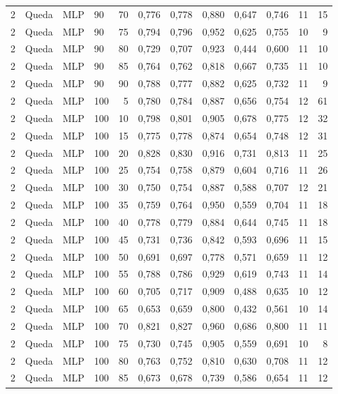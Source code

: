 \begin{longtable}{ccclrrrrrrrr}
2 & Queda & MLP & 90 & 70 & 0,776 & 0,778 & 0,880 & 0,647 & 0,746 & 11 & 15 \\
2 & Queda & MLP & 90 & 75 & 0,794 & 0,796 & 0,952 & 0,625 & 0,755 & 10 & 9 \\
2 & Queda & MLP & 90 & 80 & 0,729 & 0,707 & 0,923 & 0,444 & 0,600 & 11 & 10 \\
2 & Queda & MLP & 90 & 85 & 0,764 & 0,762 & 0,818 & 0,667 & 0,735 & 11 & 10 \\
2 & Queda & MLP & 90 & 90 & 0,788 & 0,777 & 0,882 & 0,625 & 0,732 & 11 & 9 \\
2 & Queda & MLP & 100 & 5 & 0,780 & 0,784 & 0,887 & 0,656 & 0,754 & 12 & 61 \\
2 & Queda & MLP & 100 & 10 & 0,798 & 0,801 & 0,905 & 0,678 & 0,775 & 12 & 32 \\
2 & Queda & MLP & 100 & 15 & 0,775 & 0,778 & 0,874 & 0,654 & 0,748 & 12 & 31 \\
2 & Queda & MLP & 100 & 20 & 0,828 & 0,830 & 0,916 & 0,731 & 0,813 & 11 & 25 \\
2 & Queda & MLP & 100 & 25 & 0,754 & 0,758 & 0,879 & 0,604 & 0,716 & 11 & 26 \\
2 & Queda & MLP & 100 & 30 & 0,750 & 0,754 & 0,887 & 0,588 & 0,707 & 12 & 21 \\
2 & Queda & MLP & 100 & 35 & 0,759 & 0,764 & 0,950 & 0,559 & 0,704 & 11 & 18 \\
2 & Queda & MLP & 100 & 40 & 0,778 & 0,779 & 0,884 & 0,644 & 0,745 & 11 & 18 \\
2 & Queda & MLP & 100 & 45 & 0,731 & 0,736 & 0,842 & 0,593 & 0,696 & 11 & 15 \\
2 & Queda & MLP & 100 & 50 & 0,691 & 0,697 & 0,778 & 0,571 & 0,659 & 11 & 12 \\
2 & Queda & MLP & 100 & 55 & 0,788 & 0,786 & 0,929 & 0,619 & 0,743 & 11 & 14 \\
2 & Queda & MLP & 100 & 60 & 0,705 & 0,717 & 0,909 & 0,488 & 0,635 & 10 & 12 \\
2 & Queda & MLP & 100 & 65 & 0,653 & 0,659 & 0,800 & 0,432 & 0,561 & 10 & 14 \\
2 & Queda & MLP & 100 & 70 & 0,821 & 0,827 & 0,960 & 0,686 & 0,800 & 11 & 11 \\
2 & Queda & MLP & 100 & 75 & 0,730 & 0,745 & 0,905 & 0,559 & 0,691 & 10 & 8 \\
2 & Queda & MLP & 100 & 80 & 0,763 & 0,752 & 0,810 & 0,630 & 0,708 & 11 & 12 \\
2 & Queda & MLP & 100 & 85 & 0,673 & 0,678 & 0,739 & 0,586 & 0,654 & 11 & 12 \\

\end{longtable}
